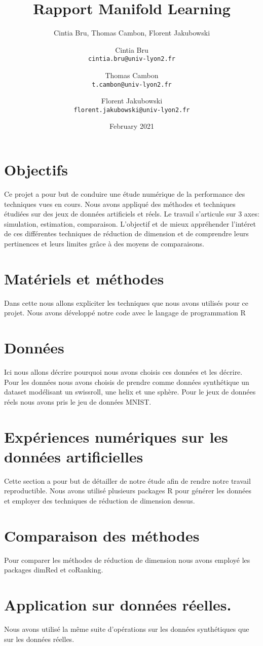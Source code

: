 \documentclass{article}
\title{Rapport Manifold Learning}
\author{Cintia Bru, Thomas Cambon, Florent Jakubowski }
\author{
  Cintia Bru\\
  \texttt{cintia.bru@univ-lyon2.fr}
  \and
  Thomas Cambon\\
  \texttt{t.cambon@univ-lyon2.fr}
  \and
  Florent Jakubowski\\
  \texttt{florent.jakubowski@univ-lyon2.fr}
}
\date{February 2021}
\begin{document}
\maketitle
\tableofcontents

\begin{multicols}{2}
\section{Objectifs}
Ce projet a pour but de conduire une étude numérique de la performance des techniques vues en cours. Nous avons appliqué des méthodes et techniques étudiées sur des jeux de données artificiels et réels. Le travail s’articule sur 3 axes: simulation, estimation, comparaison.
L'objectif et de mieux appréhender l'intéret de ces différentes techniques de réduction de dimension et de comprendre leurs pertinences et leurs limites grâce à des moyens de comparaisons.
\section{Matériels et méthodes}
Dans cette nous allons expliciter les techniques que nous avons utilisés pour ce projet.
Nous avons développé notre code avec le langage de programmation R
\section{Données}
Ici nous allons décrire pourquoi nous avons choisis ces données et les décrire. 
Pour les données nous avons choisis de prendre comme données synthétique un dataset modélisant un swissroll, une helix et une sphère. Pour le jeux de données réels nous avons pris le jeu de données MNIST.
\section{Expériences numériques sur les 
données artificielles }
Cette section a pour but de détailler de notre étude afin de rendre notre travail reproductible.
Nous avons utilisé plusieurs packages R pour générer les données et employer des techniques de réduction de dimension dessus. 
\section{Comparaison des méthodes }
Pour comparer les méthodes de réduction de dimension nous avons employé les packages dimRed et coRanking. 
\section{Application sur données réelles. }
Nous avons utilisé la même suite d'opérations sur les données synthétiques que sur les données réelles. 
\end{multicols}
\end{document}
